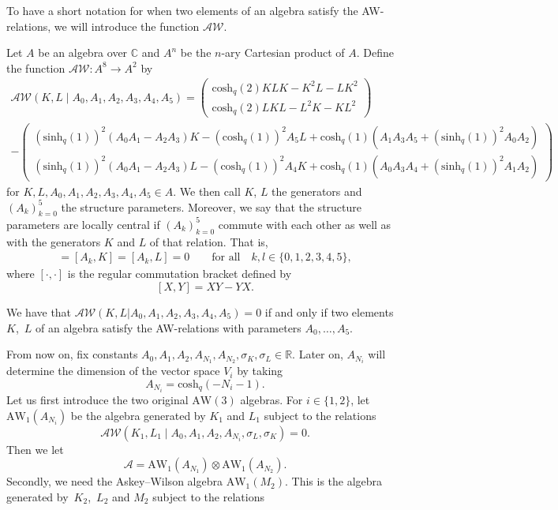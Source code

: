 \documentclass[10pt,a4paper]{amsart}
\numberwithin{equation}{section}
\newcommand{\RR}{\mathbb{R}}
\newcommand{\CC}{\mathbb{C}}
\newcommand{\aw}{\mathrm{AW}\!\left(3\right)}
\newcommand{\awc}[2]{\mathrm{AW}_{#1}\!\left(#2\right)}
\newcommand{\awr}{\mathscr{A}\!\!\mathscr{W}}
\newcommand{\chq}{\mathrm{cosh}_q}
\newcommand{\shq}{\mathrm{sinh}_q}
\begin{document}
To have a short notation for when two elements of an algebra satisfy the AW-relations, we will introduce the function $\awr$.
\begin{Definition}
	Let $A$ be an algebra over $\CC$ and $A^{ n}$ be the $n$-ary Cartesian product of $A$. Define the function $\awr\colon A^{8}\to A^{2}$ by
	\begin{gather*}
		\awr(K,L\mid A_0,A_1,A_2,A_3,A_4,A_5)=\left(\begin{matrix}\chq(2) KLK - K^2L -LK^2 \\ \chq(2)LKL - L^2K -KL^2 \end{matrix}\right) \\
		-\left(\begin{matrix}	(\shq(1))^2(A_0A_1\! -\!A_2A_3)K \!-\! (\chq(1))^2A_5L \!+\! \chq(1)(A_1A_3A_5\!+\!(\shq(1))^2A_0A_2)		\\ (\shq(1))^2(A_0A_1\! -\!A_2A_3)L \!-\!(\chq(1))^2A_4K \!+\!\chq(1)(A_0A_3A_4\!+\!(\shq(1))^2A_1A_2) \end{matrix}\right)
	\end{gather*}
	for $K,L,A_0,A_1,A_2,A_3,A_4,A_5\in A$. We then call $K$, $L$ the generators and $(A_k)_{k=0}^5$ the structure parameters. Moreover, we say that the structure parameters are locally central if $(A_k)_{k=0}^5$ commute with each other as well as with the generators $K$ and $L$ of that relation. That is,
	\begin{gather*}
		[A_k,A_l]=[A_k,K]=[A_k,L]=0 \qquad \text{for all} \quad k,l\in\{0,1,2,3,4,5\},
	\end{gather*}
	where $[\cdot,\cdot]$ is the regular commutation bracket defined by
	\[
	[X,Y]=XY-YX.
	\]
\end{Definition}
\begin{Remark}
	We have that $\awr(K,L|A_0,A_1,A_2,A_3,A_4,A_5)=0$ if and only if two elements $K$,~$L$ of an algebra satisfy the AW-relations with parameters $A_0,\dots, A_5$.
\end{Remark}
From now on, fix constants $A_0,A_1,A_2,A_{N_1},A_{N_2},\sigma_K,\sigma_L\in\RR$. Later on, $A_{N_i}$ will determine the dimension of the vector space $V_i$ by taking
\[
A_{N_i}=\chq(-N_i-1).
\]
Let us first introduce the two original $\aw$ algebras. For $i\in\{1,2\}$, let $\awc{1}{A_{N_i}}$ be the algebra generated by $K_1$ and $L_1$ subject to the relations
\[
\awr(K_1,L_1\mid A_0,A_1,A_2,A_{N_i},\sigma_L,\sigma_K)=0.
\]
Then we let
\[
\mathscr{A}=\awc{1}{A_{N_1}}\otimes\awc{1}{A_{N_2}}.
\]
Secondly, we need the Askey--Wilson algebra $\awc{1}{M_2}$. This is the algebra generated by~$K_2$,~$L_2$ and $M_2$ subject to the relations
\end{document}
